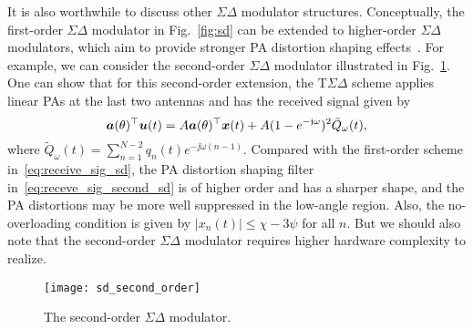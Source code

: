 \documentclass[10pt,twocolumn,twoside]{IEEEtran}
\begin{document}
It is also worthwhile to discuss other $\Sigma \Delta$ modulator structures.
Conceptually, the first-order $\Sigma \Delta$ modulator in Fig.~\ref{fig:sd} can be extended to higher-order $\Sigma \Delta$ modulators,
which aim to provide stronger PA distortion shaping effects~\cite{aziz1996overview,corey2016spatial,shao2020multiuser}.
For example, we can consider the second-order $\Sigma \Delta$ modulator  illustrated in Fig.~\ref{fig:sd_second_order}.
One can show that for this second-order extension, the T$\Sigma \Delta$ scheme applies linear PAs at the last two antennas and has the received signal given by
\begin{equation}\label{eq:receve_sig_second_sd}
{\bm a}(\theta)^\top {\bm u}(t) = A{\bm a}(\theta)^\top {\bm x}(t) + A(1 - e^{-{\mathfrak j} \omega})^2  \tilde Q_\omega(t),
\end{equation}
where $\tilde Q_\omega(t)=\sum_{n=1}^{N-2}q_n(t)e^{- \jj \omega(n-1)}$.
Compared with the first-order scheme in~\eqref{eq:receive_sig_sd}, the PA distortion shaping filter in~\eqref{eq:receve_sig_second_sd} is of higher order and has a sharper shape,
and the PA distortions may be more well suppressed in the low-angle region.
Also, the no-overloading condition is given by $|x_n(t)| \le \chi - 3\psi$ for all $n$.
But we should also note that the second-order $\Sigma \Delta$ modulator  requires higher hardware complexity to realize.



\begin{figure}[t]
	\centering
	\texttt{[image: sd\_second\_order]}
	\caption{The second-order ${\Sigma \Delta}$ modulator.}
	\label{fig:sd_second_order}
\end{figure}
\end{document}
